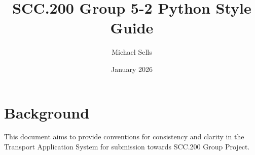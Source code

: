 \documentclass{article}
\title{SCC.200 Group 5-2 Python Style Guide}
\author{Michael Sells}
\date{January 2026}
\begin{document}
\maketitle

\tableofcontents
\newpage

\section{Background}
This document aims to provide conventions for consistency and clarity in the Transport Application System for submission towards SCC.200 Group Project.



\end{document}
